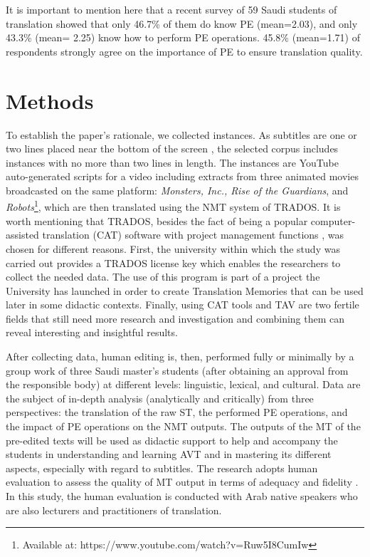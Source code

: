 \documentclass[english]{textolivre}
\begin{document}
It is important to mention here that a recent survey of 59 Saudi students of translation showed that only 46.7\% of them do know PE (mean=2.03), and only 43.3\% (mean= 2.25) know how to perform PE operations. 45.8\% (mean=1.71) of respondents strongly agree on the importance of PE to ensure translation quality.

\section{Methods}

To establish the paper’s rationale, we collected instances. As subtitles are one or two lines placed near the bottom of the screen \cite{karkabou_childrens_2019}, the selected corpus includes instances with no more than two lines in length. The instances are YouTube auto-generated scripts for a video including extracts from three animated movies broadcasted on the same platform: \emph{ Monsters, Inc., Rise of the Guardians}, and \emph{Robots}\footnote{Available at: https://www.youtube.com/watch?v=Ruw5I8CumIw}, which are then translated using the NMT system of TRADOS. It is worth mentioning that TRADOS, besides the fact of being a popular computer-assisted translation (CAT) software with project management functions \cite{wang_translation_2016}, was chosen for different reasons. First, the university within which the study was carried out provides a TRADOS license key which enables the researchers to collect the needed data. The use of this program is part of a project the University has launched in order to create Translation Memories that can be used later in some didactic contexts. Finally, using CAT tools and TAV are two fertile fields that still need more research and investigation and combining them can reveal interesting and insightful results.

After collecting data, human editing is, then, performed fully or minimally by a group work of three Saudi master's students (after obtaining an approval from the responsible body) at different levels: linguistic, lexical, and cultural. Data are the subject of in-depth analysis (analytically and critically) from three perspectives: the translation of the raw ST, the performed PE operations, and the impact of PE operations on the NMT outputs. The outputs of the MT of the pre-edited texts will be used as didactic support to help and accompany the students in understanding and learning AVT and in mastering its different aspects, especially with regard to subtitles. The research adopts human evaluation to assess the quality of MT output in terms of adequacy and fidelity \cite[p. 2]{afzaal_automated_2022}. In this study, the human evaluation is conducted with Arab native speakers who are also lecturers and practitioners of translation.
\end{document}
